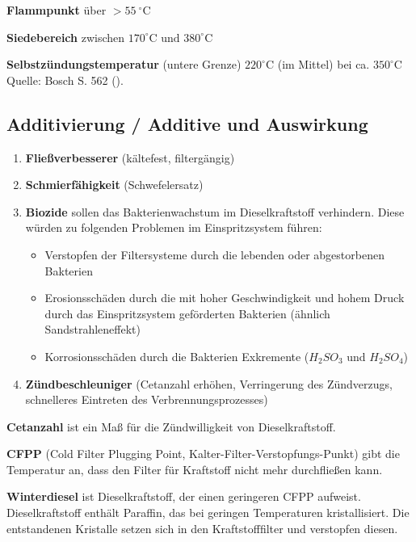 \textbf{Flammpunkt} über $>55~^\circ\text{C}$

\textbf{Siedebereich} zwischen
$170^\circ\text{C} \text{ und } 380^\circ\text{C}$

\textbf{Selbstzündungstemperatur} (untere Grenze) $220^\circ\text{C}$
(im Mittel) bei ca. $350^\circ\text{C}$ Quelle: Bosch S. 562
(\textcite{reif:2022:boschkraftfahrtechnisches}).

\subsection{Additivierung / Additive und
Auswirkung}\label{additivierung-additive-und-auswirkung}

\begin{enumerate}
\item
  \textbf{Fließverbesserer} (kältefest, filtergängig)
\item
  \textbf{Schmierfähigkeit} (Schwefelersatz)
\item
  \textbf{Biozide} sollen das Bakterienwachstum im Dieselkraftstoff
  verhindern. Diese würden zu folgenden Problemen im Einspritzsystem
  führen:

  \begin{itemize}
  \item
    Verstopfen der Filtersysteme durch die lebenden oder abgestorbenen
    Bakterien
  \item
    Erosionsschäden durch die mit hoher Geschwindigkeit und hohem Druck
    durch das Einspritzsystem geförderten Bakterien (ähnlich
    Sandstrahleneffekt)
  \item
    Korrosionsschäden durch die Bakterien Exkremente ($H_2SO_3$ und
    $H_2SO_4$)
  \end{itemize}
\item
  \textbf{Zündbeschleuniger} (Cetanzahl erhöhen, Verringerung des
  Zündverzugs, schnelleres Eintreten des Verbrennungsprozesses)
\end{enumerate}

\textbf{Cetanzahl} ist ein Maß für die Zündwilligkeit von
Dieselkraftstoff.

\textbf{CFPP} (Cold Filter Plugging Point,
Kalter-Filter-Verstopfungs-Punkt) gibt die Temperatur an, dass den
Filter für Kraftstoff nicht mehr durchfließen kann.

\textbf{Winterdiesel} ist Dieselkraftstoff, der einen geringeren CFPP
aufweist. Dieselkraftstoff enthält Paraffin, das bei geringen
Temperaturen kristallisiert. Die entstandenen Kristalle setzen sich in
den Kraftstofffilter und verstopfen diesen.

